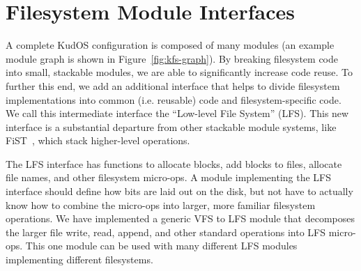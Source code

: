 \preparagraphspacing{}
\section*{Filesystem Module Interfaces}
\label{sec:interfaces}

A complete KudOS configuration is composed of many modules (an example module
graph is shown in Figure~\ref{fig:kfs-graph}). By breaking filesystem code into
small, stackable modules, we are able to significantly increase code reuse. To
further this end, we add an additional interface that helps to divide filesystem
implementations into common (i.e. reusable) code and filesystem-specific code.
We call this intermediate interface the ``Low-level File System'' (LFS). This
new interface is a substantial departure from other stackable module systems,
like FiST~\cite{zadok00fist}, which stack higher-level operations.

The LFS interface has functions to allocate blocks, add blocks to
files, allocate file names, and other filesystem micro-ops. A module
implementing the LFS interface should define how bits are laid out on
the disk, but not have to actually know how to combine the micro-ops
into larger, more familiar filesystem operations. We have implemented
a generic VFS to LFS module that decomposes the larger file write,
read, append, and other standard operations into LFS micro-ops. This
one module can be used with many different LFS modules implementing
different filesystems.
